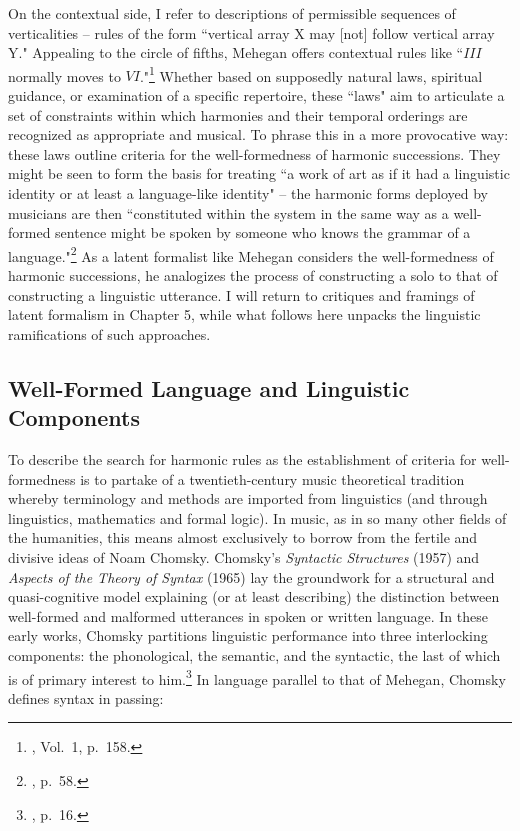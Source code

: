 On the contextual side, I refer to descriptions of permissible sequences of verticalities -- rules of the form ``vertical array X may [not] follow vertical array Y."  Appealing to the circle of fifths, Mehegan offers contextual rules like ``$III$ normally moves to $VI$."\footnote{\cite{mehegan1959}, Vol.\ 1, p.\ 158.}  Whether based on supposedly natural laws, spiritual guidance, or examination of a specific repertoire, these ``laws" aim to articulate a set of constraints within which harmonies and their temporal orderings are recognized as appropriate and musical.  To phrase this in a more provocative way: these laws outline criteria for the well-formedness of harmonic successions.  They might be seen to form the basis for treating ``a work of art as if it had a linguistic identity or at least a language-like identity" -- the harmonic forms deployed by musicians are then ``constituted within the system in the same way as a well-formed sentence might be spoken by someone who knows the grammar of a language."\footnote{\cite{davis2011}, p.\ 58.}  As a latent formalist like Mehegan considers the well-formedness of harmonic successions, he analogizes the process of constructing a solo to that of constructing a linguistic utterance.  I will return to critiques and framings of latent formalism in Chapter 5, while what follows here unpacks the linguistic ramifications of such approaches.

\subsection{Well-Formed Language and Linguistic Components}

To describe the search for harmonic rules as the establishment of criteria for well-formedness is to partake of a twentieth-century music theoretical tradition whereby terminology and methods are imported from linguistics (and through linguistics, mathematics and formal logic).  In music, as in so many other fields of the humanities, this means almost exclusively to borrow from the fertile and divisive ideas of Noam Chomsky.  Chomsky's \emph{Syntactic Structures} (1957) and \emph{Aspects of the Theory of Syntax} (1965) lay the groundwork for a structural and quasi-cognitive model explaining (or at least describing) the distinction between well-formed and malformed utterances in spoken or written language.  In these early works, Chomsky partitions linguistic performance into three interlocking components: the phonological, the semantic, and the syntactic, the last of which is of primary interest to him.\footnote{\cite{chomsky1965}, p.\ 16.}  In language parallel to that of Mehegan, Chomsky defines syntax in passing:

